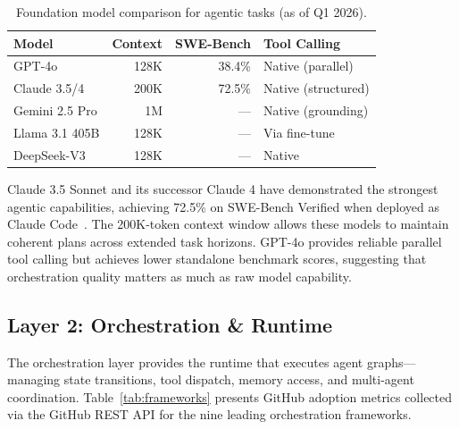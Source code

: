 \documentclass[12pt, a4paper]{article}
\begin{document}
\begin{table}[ht]
\centering
\caption{Foundation model comparison for agentic tasks (as of Q1 2026).}
\label{tab:models}
\begin{tabular}{lrrl}
\toprule
\textbf{Model} & \textbf{Context} & \textbf{SWE-Bench} & \textbf{Tool Calling} \\
\midrule
GPT-4o          & 128K   & 38.4\%  & Native (parallel) \\
Claude 3.5/4    & 200K   & 72.5\%  & Native (structured) \\
Gemini 2.5 Pro  & 1M     & ---     & Native (grounding) \\
Llama 3.1 405B  & 128K   & ---     & Via fine-tune \\
DeepSeek-V3     & 128K   & ---     & Native \\
\bottomrule
\end{tabular}
\end{table}

Claude 3.5 Sonnet and its successor Claude 4 have demonstrated the strongest agentic capabilities, achieving 72.5\% on SWE-Bench Verified when deployed as Claude Code~\citep{anthropic2024claude}. The 200K-token context window allows these models to maintain coherent plans across extended task horizons. GPT-4o provides reliable parallel tool calling but achieves lower standalone benchmark scores, suggesting that orchestration quality matters as much as raw model capability.

\subsection{Layer 2: Orchestration \& Runtime}
The orchestration layer provides the runtime that executes agent graphs---managing state transitions, tool dispatch, memory access, and multi-agent coordination. Table~\ref{tab:frameworks} presents GitHub adoption metrics collected via the GitHub REST API for the nine leading orchestration frameworks.
\end{document}
